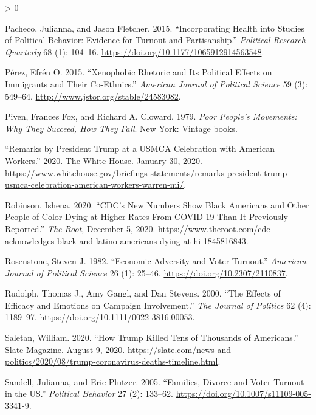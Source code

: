\documentclass[
  12pt,
]{article}
\newlength{\cslhangindent}
\newenvironment{CSLReferences}[2] %
 {%
  \setlength{\parindent}{0pt}
  \ifodd #1 \everypar{\setlength{\hangindent}{\cslhangindent}}\ignorespaces\fi
  \ifnum #2 > 0
  \setlength{\parskip}{#2\baselineskip}
  \fi
 }%
 {}
\begin{document}
\begin{CSLReferences}{1}{0}
\leavevmode\hypertarget{ref-Pacheco2015}{}%
Pacheco, Julianna, and Jason Fletcher. 2015. {``Incorporating {Health} into {Studies} of {Political Behavior}: {Evidence} for {Turnout} and {Partisanship}.''} \emph{Political Research Quarterly} 68 (1): 104--16. \url{https://doi.org/10.1177/1065912914563548}.

\leavevmode\hypertarget{ref-Perez2015}{}%
Pérez, Efrén O. 2015. {``Xenophobic {Rhetoric} and {Its Political Effects} on {Immigrants} and {Their Co}-{Ethnics}.''} \emph{American Journal of Political Science} 59 (3): 549--64. \url{http://www.jstor.org/stable/24583082}.

\leavevmode\hypertarget{ref-Piven1979}{}%
Piven, Frances Fox, and Richard A. Cloward. 1979. \emph{Poor People's Movements: Why They Succeed, How They Fail}. {New York}: {Vintage books}.

\leavevmode\hypertarget{ref-whitehouse2020}{}%
{``Remarks by {President Trump} at a {USMCA Celebration} with {American Workers}.''} 2020. {The White House}. January 30, 2020. \url{https://www.whitehouse.gov/briefings-statements/remarks-president-trump-usmca-celebration-american-workers-warren-mi/}.

\leavevmode\hypertarget{ref-Robinson2020}{}%
Robinson, Ishena. 2020. {``{CDC}'s {New Numbers Show Black Americans} and {Other People} of {Color Dying} at {Higher Rates From COVID}-19 {Than It Previously Reported}.''} \emph{The Root}, December 5, 2020. \url{https://www.theroot.com/cdc-acknowledges-black-and-latino-americans-dying-at-hi-1845816843}.

\leavevmode\hypertarget{ref-Rosenstone1982}{}%
Rosenstone, Steven J. 1982. {``Economic {Adversity} and {Voter Turnout}.''} \emph{American Journal of Political Science} 26 (1): 25--46. \url{https://doi.org/10.2307/2110837}.

\leavevmode\hypertarget{ref-Rudolph2000}{}%
Rudolph, Thomas J., Amy Gangl, and Dan Stevens. 2000. {``The {Effects} of {Efficacy} and {Emotions} on {Campaign Involvement}.''} \emph{The Journal of Politics} 62 (4): 1189--97. \url{https://doi.org/10.1111/0022-3816.00053}.

\leavevmode\hypertarget{ref-Saletan2020}{}%
Saletan, William. 2020. {``How {Trump Killed Tens} of {Thousands} of {Americans}.''} {Slate Magazine}. August 9, 2020. \url{https://slate.com/news-and-politics/2020/08/trump-coronavirus-deaths-timeline.html}.

\leavevmode\hypertarget{ref-Sandell2005}{}%
Sandell, Julianna, and Eric Plutzer. 2005. {``Families, Divorce and Voter Turnout in the {US}.''} \emph{Political Behavior} 27 (2): 133--62. \url{https://doi.org/10.1007/s11109-005-3341-9}.


\end{CSLReferences}
\end{document}
